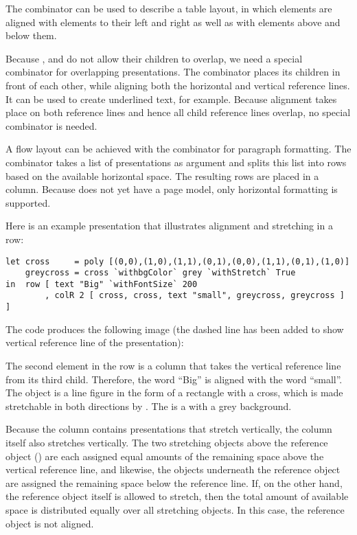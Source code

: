The  combinator can be used to describe a table layout, in which elements are aligned with elements to their left and right as well as with elements above and below them. 

Because ,  and  do not allow their children to overlap, we need a special combinator for overlapping presentations. The  combinator places its children in front of each other, while aligning both the horizontal and vertical reference lines. It can be used to create underlined text, for example. Because alignment takes place on both reference lines and hence all child reference lines overlap, no special  combinator is needed.

A flow layout can be achieved with the  combinator for paragraph formatting. The combinator takes a list of presentations as argument and splits this list into rows based on the available horizontal space. The resulting rows are placed in a column.  Because  does not yet have a page model, only horizontal formatting is supported. 

Here is an example {\Xprez} presentation that illustrates alignment and stretching in a row:

\begin{small}
\begin{verbatim}
let cross     = poly [(0,0),(1,0),(1,1),(0,1),(0,0),(1,1),(0,1),(1,0)]
    greycross = cross `withbgColor` grey `withStretch` True
in  row [ text "Big" `withFontSize` 200
        , colR 2 [ cross, cross, text "small", greycross, greycross ] ] 
\end{verbatim}
\end{small}

The code produces the following image (the dashed line has been added to show vertical reference line of the presentation):

\begin{center}
\end{center}

The second element in the row is a column that takes the vertical reference line from its third child. Therefore, the word ``Big'' is aligned with the word ``small''. The  object is a line figure in the form of a rectangle with a cross, which is made stretchable in both directions by . The  is a  with a grey background. 
 
Because the column contains presentations that stretch vertically, the column itself also stretches vertically. The two stretching objects above the reference object () are each assigned equal amounts of the remaining space above the vertical reference line, and likewise, the objects underneath the reference object are assigned the remaining space below the reference line. If, on the other hand, the reference object itself is allowed to stretch, then the total amount of available space is distributed equally over all stretching objects. In this case, the reference object is not aligned. 

